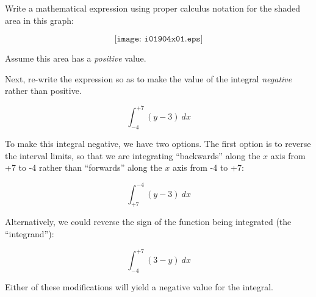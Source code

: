

Write a mathematical expression using proper calculus notation for the shaded area in this graph:

$$\texttt{[image: i01904x01.eps]}$$

Assume this area has a {\it positive} value.

\vskip 10pt

Next, re-write the expression so as to make the value of the integral {\it negative} rather than positive.







$$\int_{-4}^{+7} (y - 3) \> dx$$

\vskip 10pt

To make this integral negative, we have two options.  The first option is to reverse the interval limits, so that we are integrating ``backwards'' along the $x$ axis from +7 to -4 rather than ``forwards'' along the $x$ axis from -4 to +7:

$$\int_{+7}^{-4} (y - 3) \> dx$$

Alternatively, we could reverse the sign of the function being integrated (the ``integrand''):

$$\int_{-4}^{+7} (3 - y) \> dx$$

Either of these modifications will yield a negative value for the integral.











